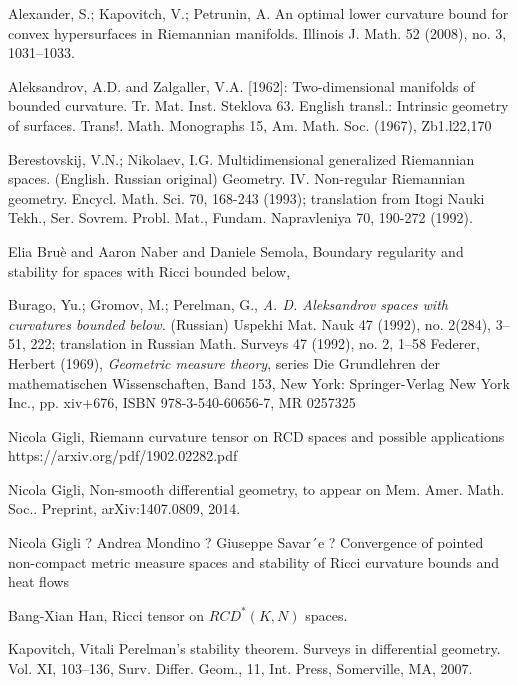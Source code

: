 \begin{thebibliography}{52}


 Alexander, S.; Kapovitch, V.; Petrunin, A.
An optimal lower curvature bound for convex hypersurfaces in Riemannian manifolds.
Illinois J. Math. 52 (2008), no. 3, 1031--1033.

Aleksandrov, A.D. and Zalgaller, V.A. [1962]: Two-dimensional manifolds of bounded curvature.
Tr. Mat. Inst. Steklova 63. English transl.: Intrinsic geometry of surfaces. Trans!. Math. Monographs
15, Am. Math. Soc. (1967), Zb1.l22,170


Berestovskij, V.N.; Nikolaev, I.G.
Multidimensional generalized Riemannian spaces. (English. Russian original)
Geometry. IV. Non-regular Riemannian geometry. Encycl. Math. Sci. 70, 168-243 (1993); translation from Itogi Nauki Tekh., Ser. Sovrem. Probl. Mat., Fundam. Napravleniya 70, 190-272 (1992).


 Elia Bruè and Aaron Naber and Daniele Semola, Boundary regularity and stability for spaces with Ricci bounded below, 


 Burago, Yu.; Gromov, M.; Perelman, G., \textit{A. D. Aleksandrov spaces
with curvatures bounded below.} (Russian)  Uspekhi Mat. Nauk  47  (1992),  no.
2(284), 3--51, 222;   translation in  Russian Math. Surveys  47  (1992),  no. 2, 1--58
Federer, Herbert (1969), \textit{Geometric measure theory}, series Die Grundlehren der mathematischen Wissenschaften, Band 153, New York: Springer-Verlag New York Inc., pp. xiv+676, ISBN 978-3-540-60656-7, MR 0257325

Nicola Gigli,
Riemann curvature tensor on RCD spaces and possible applications https://arxiv.org/pdf/1902.02282.pdf

Nicola Gigli,
Non-smooth differential geometry, to appear on Mem. Amer. Math. Soc..
Preprint, arXiv:1407.0809, 2014.

Nicola Gigli ? Andrea Mondino ? Giuseppe Savar´e ?
Convergence of pointed non-compact metric measure spaces
and stability of Ricci curvature bounds and heat flows



 Bang-Xian Han, 
Ricci tensor on $RCD^*(K, N)$ spaces.

 Kapovitch, Vitali Perelman's stability theorem. Surveys in differential geometry. Vol. XI, 103–136, Surv. Differ. Geom., 11, Int. Press, Somerville, MA, 2007.


\end{thebibliography}

